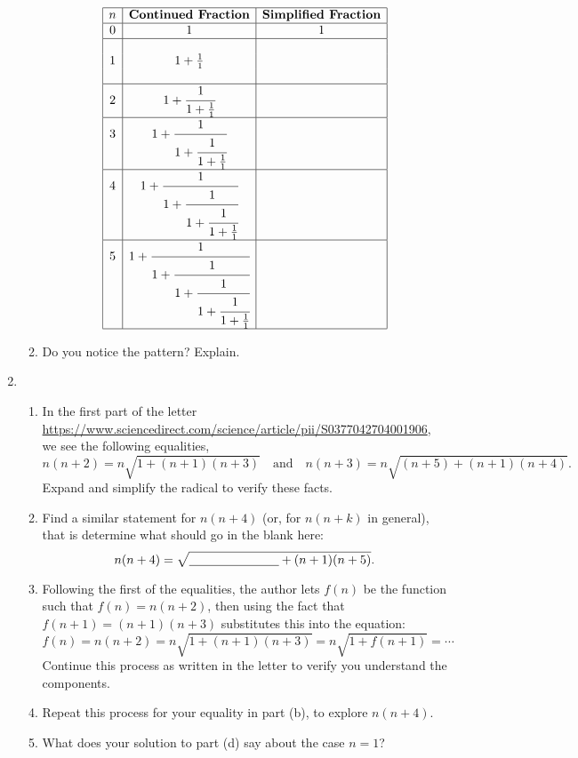 \documentclass[12pt]{article}
\begin{document}
\begin{enumerate}
\begin{enumerate}
			 	$$\begin{array}{|c|c|c|}
			 	\hline
			 	n&\textbf{Continued Fraction}&\textbf{Simplified Fraction}\\\hline
			 	0 & 1& 1\\\hline&&\\
			 	1 & 1+\frac{1}{1}&\\&&\\\hline
			 	2 & 1+\cfrac{1}{1+\frac{1}{1}}&\\\hline
			 	3 & 1+\cfrac{1}{1+\cfrac{1}{1+\frac{1}{1}}}&\\\hline
			 	4 & 1+\cfrac{1}{1+\cfrac{1}{1+\cfrac{1}{1+\frac{1}{1}}}}&\\\hline
			 	5 & 1+\cfrac{1}{1+\cfrac{1}{1+\cfrac{1}{1+\cfrac{1}{1+\frac{1}{1}}}}}&\\\hline
			 	\end{array}$$
			 \item Do you notice the pattern? Explain. 
		\end{enumerate}
	\newpage
	\item 
	\begin{enumerate}
		\item In the first part of the letter \url{https://www.sciencedirect.com/science/article/pii/S0377042704001906}, we see the following equalities,
			$$
			n(n+2)=n\sqrt{1+(n+1)(n+3)}
			\quad\text{and}\quad
			n(n+3)=n\sqrt{(n+5)+(n+1)(n+4)}.
			$$
		Expand and simplify the radical to verify these facts.
		\vfill
		\item Find a similar statement for $n(n+4)$ (or, for $n(n+k)$ in general), that is determine what should go in the blank here:			$$n(n+4)=\sqrt{\underline{\hspace*{1in}}+(n+1)(n+5)}.$$
		\vfill
		\item Following the first of the equalities, the author lets $f(n)$ be the function such that $f(n)=n(n+2)$, then using the fact that $f(n+1)=(n+1)(n+3)$ substitutes this into the equation:	\[f(n)=n(n+2)=n\sqrt{1+(n+1)(n+3)}=n\sqrt{1+f(n+1)}=\cdots\]
		Continue this process as written in the letter to verify you understand the components.\vfill
		\newpage
		\item Repeat this process for your equality in part (b), to explore $n(n+4)$.\vfill
		\item What does your solution to part (d) say about the case $n=1$?\vskip 1in
	\end{enumerate}
	\end{enumerate}
\end{document}

